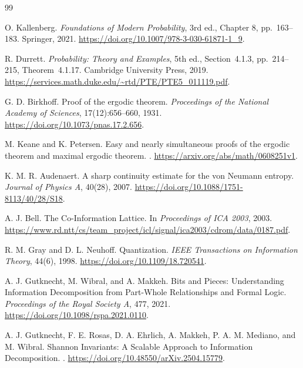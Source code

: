 \documentclass[11pt]{article}
\theoremstyle{definition}
\begin{document}
\clearpage
{}
{}
\begingroup
\small
\begin{thebibliography}{99}

O. Kallenberg.
\emph{Foundations of Modern Probability}, 3rd ed., Chapter 8, pp.~163--183.
Springer, 2021. \url{https://doi.org/10.1007/978-3-030-61871-1_9}.

R. Durrett.
\emph{Probability: Theory and Examples}, 5th ed., Section~4.1.3, pp.~214--215,
Theorem~4.1.17. Cambridge University Press, 2019.
\url{https://services.math.duke.edu/~rtd/PTE/PTE5_011119.pdf}.

G. D. Birkhoff.
\newblock Proof of the ergodic theorem.
\newblock \emph{Proceedings of the National Academy of Sciences}, 17(12):656--660, 1931.
\newblock \url{https://doi.org/10.1073/pnas.17.2.656}.

M. Keane and K. Petersen.
\newblock Easy and nearly simultaneous proofs of the ergodic theorem and maximal ergodic theorem.
. \url{https://arxiv.org/abs/math/0608251v1}.

K. M. R. Audenaert.
\newblock A sharp continuity estimate for the von Neumann entropy.
\newblock \emph{Journal of Physics A}, 40(28), 2007.
\newblock \url{https://doi.org/10.1088/1751-8113/40/28/S18}.

	A. J. Bell.
	\newblock The Co-Information Lattice.
	\newblock In \emph{Proceedings of ICA 2003}, 2003.
	\newblock \url{https://www.rd.ntt/cs/team_project/icl/signal/ica2003/cdrom/data/0187.pdf}.

R. M. Gray and D. L. Neuhoff.
\newblock Quantization.
\newblock \emph{IEEE Transactions on Information Theory}, 44(6), 1998.
\newblock \url{https://doi.org/10.1109/18.720541}.

A. J. Gutknecht, M. Wibral, and A. Makkeh.
\newblock Bits and Pieces: Understanding Information Decomposition from Part-Whole Relationships
and Formal Logic.
\newblock \emph{Proceedings of the Royal Society A}, 477, 2021.
\newblock \url{https://doi.org/10.1098/rspa.2021.0110}.

A. J. Gutknecht, F. E. Rosas, D. A. Ehrlich, A. Makkeh, P. A. M. Mediano, and M. Wibral.
\newblock Shannon Invariants: A Scalable Approach to Information Decomposition.
.
\newblock \url{https://doi.org/10.48550/arXiv.2504.15779}.


\end{thebibliography}
\end{document}
